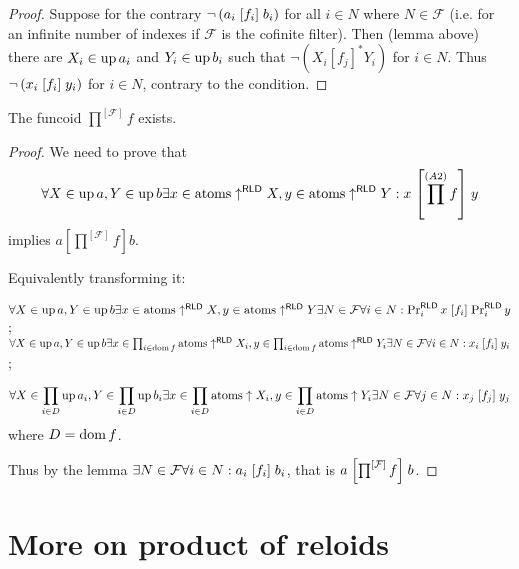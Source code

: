 \begin{proof}
  Suppose for the contrary $\neg \left( a_i \mathrel{\left[f_i\right]} b_i \right)$ for
  all $i \in N$ where $N \in \mathcal{F}$ (i.e. for an infinite number of
  indexes if $\mathcal{F}$ is the cofinite filter). Then (lemma above) there
  are $X_i \in \operatorname{up} a_i$ and $Y_i \in \operatorname{up} b_i$ such that $\neg
  \left( X_i \mathrel{[f_j]^{\ast}} Y_i \right)$ for $i \in N$. Thus $\neg
  \left( x_i \mathrel{\left[f_i\right]} y_i \right)$ for $i \in N$, contrary to the
  condition.
\end{proof}

\begin{prop}
  The funcoid $\prod^{[\mathcal{F}]} f$ exists.
\end{prop}

\begin{proof}
  We need to prove that
  \[ \forall X \in \operatorname{up} a, Y \in \operatorname{up} b \exists x \in \operatorname{atoms}
     \uparrow^{\mathsf{RLD}} X, y \in \operatorname{atoms}
     \uparrow^{\mathsf{RLD}} Y : x \mathrel{\left[ \prod^{(A 2)} f
     \right]} y \]
  implies $a \mathrel{\left[ \prod^{[\mathcal{F}]} f \right]} b$.
  
  Equivalently transforming it: 
  
  $\forall X \in \operatorname{up} a, Y \in \operatorname{up} b \exists x \in \operatorname{atoms}
  \uparrow^{\mathsf{RLD}} X, y \in \operatorname{atoms}
  \uparrow^{\mathsf{RLD}} Y \\  
  \exists N \in \mathcal{F} \forall i \in N : \Pr^{\mathsf{RLD}}_i x
  \mathrel{\left[f_i\right]} \Pr^{\mathsf{RLD}}_i y$; \\
  $\forall X \in \operatorname{up} a, Y \in \operatorname{up} b \exists x \in \prod_{i \in
  \operatorname{dom} f} \operatorname{atoms} \uparrow^{\mathsf{RLD}} X_i, y \in
  \prod_{i \in \operatorname{dom} f} \operatorname{atoms} \uparrow^{\mathsf{RLD}} Y_i \\  
  \exists N \in \mathcal{F} \forall i \in N : x_i \mathrel{\left[f_i\right]} y_i$;

  \[ \forall X \in \prod_{i \in D} \operatorname{up} a_i, Y \in \prod_{i \in D}
     \operatorname{up} b_i \exists x \in \prod_{i \in D} \mathrm{atoms} \uparrow X_i,
     y \in \prod_{i \in D} \mathrm{atoms} \uparrow Y_i \exists N \in
     \mathcal{F} \forall j \in N : x_j \mathrel{[f_j]} y_j \]
  where $D = \operatorname{dom} f$.
  
  Thus by the lemma $\exists N \in \mathcal{F} \forall i \in N : a_i
  \mathrel{\left[f_i\right]} b_i$, that is $a \mathrel{\left[\prod^{[\mathcal{F}]} f\right]} b$.
\end{proof}


\section{More on product of reloids}

